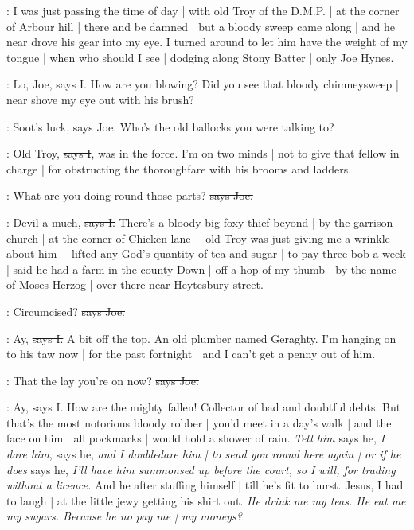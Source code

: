 \Nq:
I was just passing the time of day |
with old Troy of the D.M.P. |
at the corner of Arbour hill |
there and be damned |
but a bloody sweep came along |
and he near drove his gear into my eye.
I turned around
to let him have the weight of my tongue |
when who should I see |
dodging along Stony Batter |
only Joe Hynes.

:
Lo,
Joe,
\sout{says I.}
How are you blowing?
Did you see that bloody chimneysweep |
near shove my eye out with his brush?

\joe:
Soot's luck,
\sout{says Joe.}
Who's the old ballocks you were talking to?

:
Old Troy,
\sout{says I},
was in the force.
I'm on two minds |
not to give that fellow in charge |
for obstructing the thoroughfare
with his brooms and ladders.

\joe:
What are you doing round those parts?
\sout{says Joe.}

:
Devil a much,
\sout{says I.}
There's a bloody big foxy thief beyond |
by the garrison church |
at the corner of Chicken lane%
—old Troy was just giving me a wrinkle about him—%
lifted any God's quantity of tea and sugar |
to pay three bob a week |
said he had a farm in the county Down |
off a hop-of-my-thumb |
by the name of Moses Herzog |
over there near Heytesbury street.

\joe:
Circumcised?
\sout{says Joe.}

:
Ay,
\sout{says I.}
A bit off the top.
An old plumber named Geraghty.
I'm hanging on to his taw now |
for the past fortnight |
and I can't get a penny out of him.

\joe:
That the lay you're on now?
\sout{says Joe.}

:
Ay,
\sout{says I.}
How are the mighty fallen!
Collector of bad and doubtful debts.
But that's the most notorious bloody robber |
you'd meet in a day's walk |
and the face on him |
all pockmarks |
would hold a shower of rain.
\emph{Tell him}
says he,
\emph{I dare him},
says he,
\emph{and I doubledare him |
to send you round here again |
or if he does}
says he,
\emph{I'll have him summonsed up before the court,
so I will,
for trading without a licence.}
And he after stuffing himself |
till he's fit to burst.
Jesus,
I had to laugh |
at the little jewy getting his shirt out.
\emph{He drink me my teas.
He eat me my sugars.
Because he no pay me |
my moneys?}

